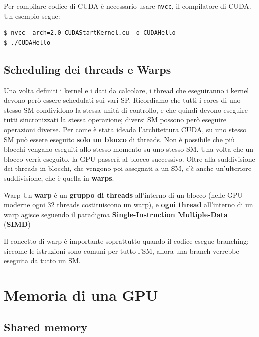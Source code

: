 Per compilare codice di CUDA è necessario usare \verb|nvcc|, il compilatore di CUDA. Un esempio segue:

\begin{terminal}
    \begin{lstlisting}[style = notexterm]
$ nvcc -arch=2.0 CUDAStartKernel.cu -o CUDAHello
$ ./CUDAHello\end{lstlisting}
\end{terminal}

\subsection{Scheduling dei threads e Warps}

Una volta definiti i kernel e i dati da calcolare, i thread che eseguiranno i kernel devono però essere schedulati sui vari SP. Ricordiamo che tutti i cores di uno stesso SM condividono la stessa unità di controllo, e che quindi devono eseguire tutti sincronizzati la stessa operazione; diversi SM possono però eseguire operazioni diverse.
\nl
Per come è stata ideada l'architettura CUDA, su uno stesso SM può essere eseguito \textbf{solo un blocco} di threads. Non è possibile che più blocchi vengano eseguiti allo stesso momento su uno stesso SM. Una volta che un blocco verrà eseguito, la GPU passerà al blocco successivo.
\nl
Oltre alla suddivisione dei threads in blocchi, che vengono poi assegnati a un SM, c'è anche un'ulteriore suddivisione, che è quella in \textbf{warps}.

\begin{definition}{Warp}
    Un \textbf{warp} è un \textbf{gruppo di threads} all'interno di un blocco (nelle GPU moderne ogni 32 threads costituiscono un warp), e \textbf{ogni thread} all'interno di un warp agisce seguendo il paradigma \textbf{Single-Instruction Multiple-Data} (\textbf{SIMD})
\end{definition}

Il concetto di warp è importante soprattutto quando il codice esegue branching: siccome le istruzioni sono comuni per tutto l'SM, allora una branch verrebbe eseguita da tutto un SM. 

\section{Memoria di una GPU}


\subsection{Shared memory}

